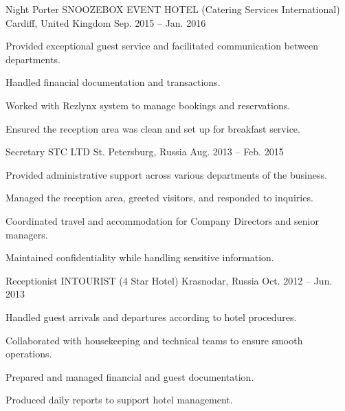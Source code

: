 \begin{cventries}
  \cventry
    {Night Porter} %
    {SNOOZEBOX EVENT HOTEL (Catering Services International)} %
    {Cardiff, United Kingdom} %
    {Sep. 2015 -- Jan. 2016} %
    {
      \begin{cvitems} %
        \item {Provided exceptional guest service and facilitated communication between departments.}
        \item {Handled financial documentation and transactions.}
        \item {Worked with Rezlynx system to manage bookings and reservations.}
        \item {Ensured the reception area was clean and set up for breakfast service.}
      \end{cvitems}
    }

  \cventry
    {Secretary} %
    {STC LTD} %
    {St. Petersburg, Russia} %
    {Aug. 2013 -- Feb. 2015} %
    {
      \begin{cvitems} %
        \item {Provided administrative support across various departments of the business.}
        \item {Managed the reception area, greeted visitors, and responded to inquiries.}
        \item {Coordinated travel and accommodation for Company Directors and senior managers.}
        \item {Maintained confidentiality while handling sensitive information.}
      \end{cvitems}
    }

  \cventry
    {Receptionist} %
    {INTOURIST (4 Star Hotel)} %
    {Krasnodar, Russia} %
    {Oct. 2012 -- Jun. 2013} %
    {
      \begin{cvitems} %
        \item {Handled guest arrivals and departures according to hotel procedures.}
        \item {Collaborated with housekeeping and technical teams to ensure smooth operations.}
        \vfill\null
        \columnbreak
        \item {Prepared and managed financial and guest documentation.}
        \item {Produced daily reports to support hotel management.}
      \end{cvitems}
    }


\end{cventries}
